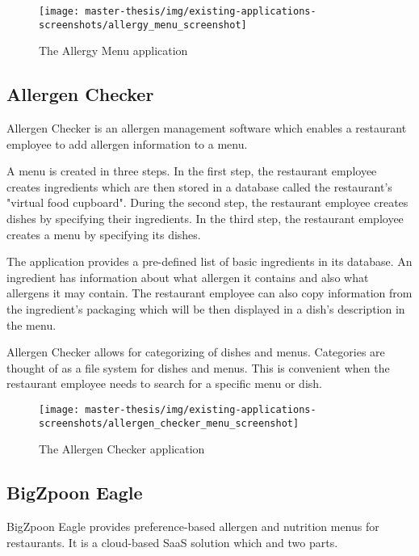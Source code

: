   \newpage

  \begin{figure}[h]
    \centering
    \texttt{[image: master-thesis/img/existing-applications-screenshots/allergy\_menu\_screenshot]}
    \caption{The Allergy Menu application}
  \end{figure}

\subsection*{Allergen Checker}
  Allergen Checker is an allergen management software which enables a restaurant employee to add allergen information to a menu.
  
  A menu is created in three steps.
  In the first step, the restaurant employee creates ingredients which are then stored in a database called the restaurant's "virtual food cupboard".
  During the second step, the restaurant employee creates dishes by specifying their ingredients.
  In the third step, the restaurant employee creates a menu by specifying its dishes.
  
  The application provides a pre-defined list of basic ingredients in its database.
  An ingredient has information about what allergen it contains and also what allergens it may contain. 
  The restaurant employee can also copy information from the ingredient's packaging which will be then displayed in a dish's description in the menu.
  
  Allergen Checker allows for categorizing of dishes and menus. 
  Categories are thought of as a file system for dishes and menus.
  This is convenient when the restaurant employee needs to search for a specific menu or dish.

  \begin{figure}[h]
    \centering
    \texttt{[image: master-thesis/img/existing-applications-screenshots/allergen\_checker\_menu\_screenshot]}
    \caption{The Allergen Checker application}
  \end{figure}

\subsection*{BigZpoon Eagle}
  BigZpoon Eagle provides preference-based allergen and nutrition menus for \linebreak restaurants.
  It is a cloud-based SaaS solution which and two parts.

